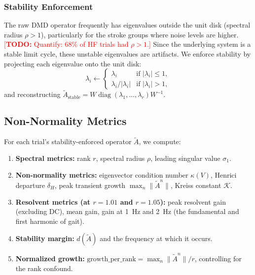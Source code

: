 \documentclass[12pt]{article}
\newcommand{\norm}[1]{\lVert #1 \rVert}
\newcommand{\abs}[1]{\lvert #1 \rvert}
\newcommand{\Atilde}{\tilde{A}}
\DeclareMathOperator{\diag}{diag}
\newcommand{\todo}[1]{\textcolor{red}{[\textbf{TODO:} #1]}}
\begin{document}
\subsubsection{Stability Enforcement}
\label{sec:stability_enforcement}

The raw DMD operator frequently has eigenvalues outside the unit disk
(spectral radius $\rho > 1$), particularly for the stroke groups where
noise levels are higher. \todo{Quantify: 68\% of HF trials had
$\rho > 1$.} Since the underlying system is a stable limit cycle, these
unstable eigenvalues are artifacts. We enforce stability by projecting
each eigenvalue onto the unit disk:
\begin{equation}
  \lambda_i \leftarrow
  \begin{cases}
    \lambda_i & \text{if } \abs{\lambda_i} \leq 1, \\
    \lambda_i / \abs{\lambda_i} & \text{if } \abs{\lambda_i} > 1,
  \end{cases}
  \label{eq:stability_clamp}
\end{equation}
and reconstructing $\Atilde_{\text{stable}} = W \diag(\lambda_1, \ldots, \lambda_r) W^{-1}$.

\subsection{Non-Normality Metrics}
\label{sec:metrics}

For each trial's stability-enforced operator $\Atilde$, we compute:

\begin{enumerate}
  \item \textbf{Spectral metrics:} rank $r$, spectral radius $\rho$,
  leading singular value $\sigma_1$.
  \item \textbf{Non-normality metrics:} eigenvector condition number
  $\kappa(V)$, Henrici departure $\delta_H$, peak transient growth
  $\max_{n} \norm{\Atilde^n}$, Kreiss constant $\mathcal{K}$.
  \item \textbf{Resolvent metrics (at $r = 1.01$ and $r = 1.05$):}
  peak resolvent gain (excluding DC), mean gain, gain at 1~Hz and 2~Hz
  (the fundamental and first harmonic of gait).
  \item \textbf{Stability margin:} $d(\Atilde)$ and the frequency
  at which it occurs.
  \item \textbf{Normalized growth:} $\text{growth\_per\_rank} = \max_n \norm{\Atilde^n} / r$,
  controlling for the rank confound.
\end{enumerate}
\end{document}
